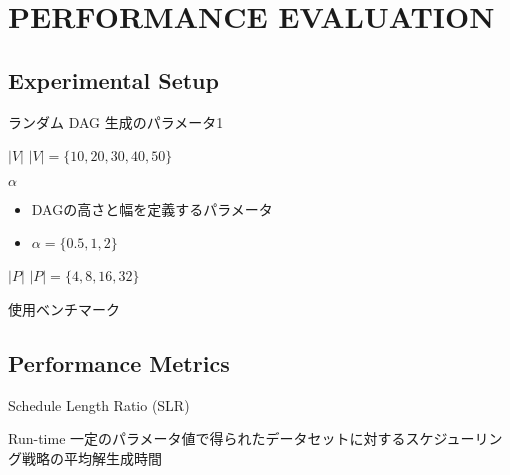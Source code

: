 
\section{PERFORMANCE EVALUATION}
\label{sec: performance evaluation}


\subsection{Experimental Setup}
\label{ssec: Experimental Setup}

\begin{frame}{ランダム DAG 生成のパラメータ1}
    \begin{block}{$|V|$}
        $|V| = \{10, 20, 30, 40, 50\}$
    \end{block}
    \begin{block}{$\alpha$}
        \setlength{\linewidth}{0.98\columnwidth}
        \begin{itemize}
            \item DAGの高さと幅を定義するパラメータ
            \item $\alpha = \{0.5, 1, 2\}$
        \end{itemize}
    \end{block}
    \begin{block}{$|P|$}
        $|P| = \{4, 8, 16, 32\}$
    \end{block}
\end{frame}

\begin{frame}{使用ベンチマーク}
\end{frame}


\subsection{Performance Metrics}
\label{ssec: Performance Metrics}

\begin{frame}{Schedule Length Ratio (SLR)}
\end{frame}

\begin{frame}{Run-time}
    一定のパラメータ値で得られたデータセットに対するスケジューリング戦略の平均解生成時間
\end{frame}


